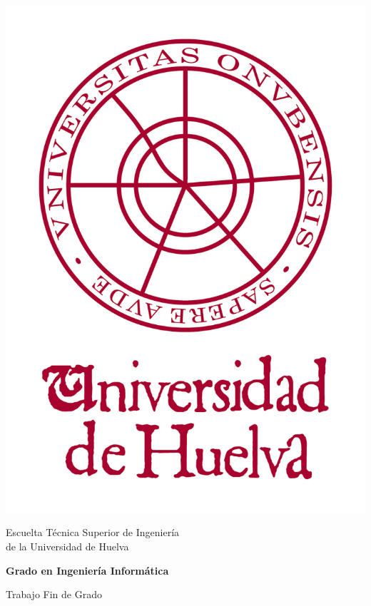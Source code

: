 \thispagestyle{empty}

{


\thispagestyle{empty}
\begin{center}
\includegraphics[scale=.6]{img/logouhu}
\end{center}

\vspace*{0cm}
\Large 

\begin{center}

{\normalsize \sc Escuelta Técnica Superior de Ingeniería \\ de la Universidad de Huelva}

{\large \bf Grado en Ingeniería Informática}

\vspace*{1cm}

{\sc Trabajo Fin de Grado}



\end{center}}
